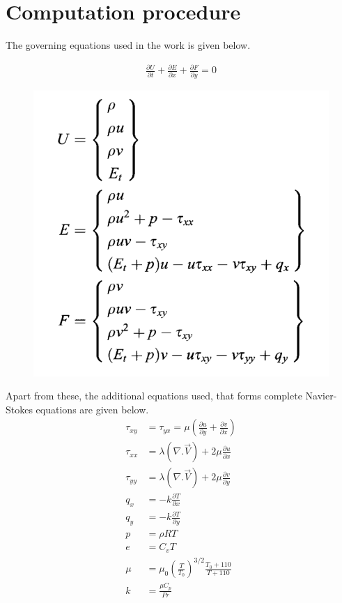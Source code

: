 \documentclass[conf]{new-aiaa}
\begin{document}
\section{Computation procedure}
\par The governing equations used in the work is given below.

\begin{align*}
    \frac{\partial U}{\partial t} + \frac{\partial E}{\partial x} + \frac{\partial F}{\partial y} = 0
\end{align*}

\begin{figure}[!h]
   \centering
    \includegraphics[scale=0.3]{supportingFiles/eqn_terms.png}
\end{figure}

\par Apart from these, the additional equations used, that forms complete
Navier-Stokes equations are given below.
\begin{align*}
    \tau_{xy} &= \tau_{yx} = \mu \left( \frac{\partial u}{\partial y} + \frac{\partial v}{\partial x} \right) \\
    \tau_{xx} &= \lambda \left( \nabla . \vec{V}\right) + 2 \mu \frac{\partial u}{\partial x} \\
    \tau_{yy} &= \lambda \left( \nabla . \vec{V}\right) + 2 \mu \frac{\partial v}{\partial y} \\
    q_x &= -k \frac{\partial T}{\partial x} \\
    q_y &= -k \frac{\partial T}{\partial y} \\
    p &= \rho R T \\
    e &= C_v T\\
    \mu &= \mu_0\left(\frac{T}{T_0}\right)^{3/2} \frac{T_0+110}{T+110} \\
    k &= \frac{\mu C_p}{Pr}
\end{align*}
\end{document}

